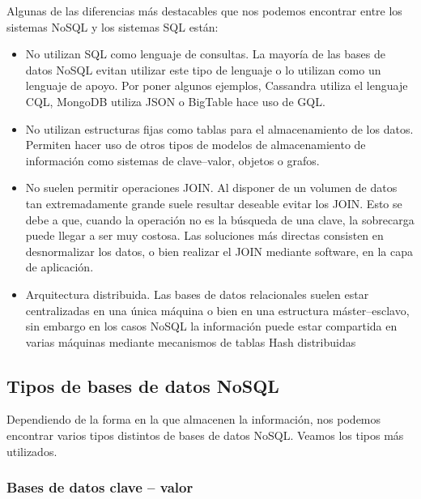 \documentclass[twoside,twocolumn]{article}
\begin{document}
Algunas de las diferencias más destacables que nos podemos encontrar entre los sistemas
 NoSQL y los sistemas SQL están: 
\begin{itemize}
    \item 	No utilizan SQL como lenguaje de consultas. La mayoría de las bases de datos NoSQL evitan utilizar este tipo de lenguaje o lo utilizan como un lenguaje de apoyo. Por poner algunos ejemplos, Cassandra utiliza el lenguaje CQL, MongoDB utiliza JSON o BigTable hace uso de GQL. 
    \item 	No utilizan estructuras fijas como tablas para el almacenamiento de los datos. Permiten hacer uso de otros tipos de modelos de almacenamiento de información como sistemas de clave–valor, objetos o grafos. 
    \item 	No suelen permitir operaciones JOIN. Al disponer de un volumen de datos tan extremadamente grande suele resultar deseable evitar los JOIN. Esto se debe a que, cuando la operación no es la búsqueda de una clave, la sobrecarga puede llegar a ser muy costosa. Las soluciones más directas consisten en desnormalizar los datos, o bien realizar el JOIN mediante software, en la capa de aplicación. 
    \item 	Arquitectura distribuida. Las bases de datos relacionales suelen estar centralizadas en una única máquina o bien en una estructura máster–esclavo, sin embargo en los casos NoSQL la información puede estar compartida en varias máquinas mediante mecanismos de tablas Hash distribuidas
     
    
\end{itemize}


\subsection{Tipos de bases de datos NoSQL}

Dependiendo de la forma en la que almacenen la información, nos podemos
encontrar varios tipos distintos de bases de datos NoSQL. Veamos los tipos 
más utilizados.


\subsubsection{Bases de datos clave – valor}
\end{document}
